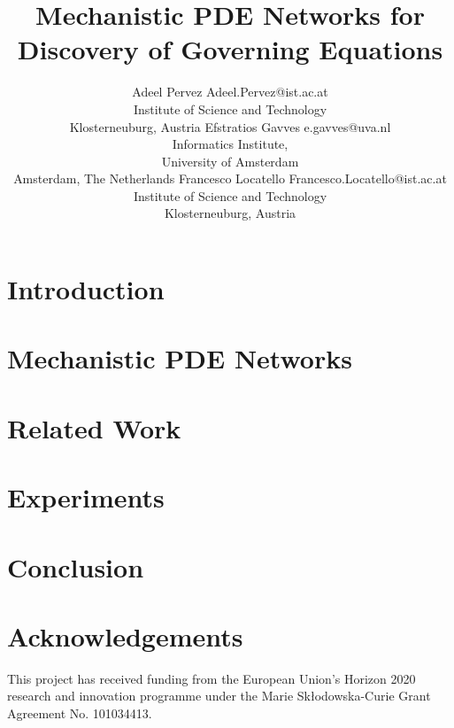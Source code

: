 \documentclass[twoside,11pt]{article}
\begin{document}
\title{Mechanistic PDE Networks for Discovery of Governing Equations}

\author{\name Adeel Pervez \email Adeel.Pervez@ist.ac.at \\
       \addr Institute of Science and Technology\\
       Klosterneuburg, Austria 
       \AND
       \name Efstratios Gavves \email e.gavves@uva.nl \\
       \addr Informatics Institute,\\
       University of Amsterdam\\
       Amsterdam, The Netherlands 
       \AND
       \name Francesco Locatello \email Francesco.Locatello@ist.ac.at\\
       \addr Institute of Science and Technology\\
       Klosterneuburg, Austria 
       }













\maketitle
\begin{abstract}

\end{abstract}


\section{Introduction}
\label{sec:intro}

\section{Mechanistic PDE Networks}
\label{sec:method}

\section{Related Work}
\label{sec:related}

\section{Experiments}
\label{sec:experiments}

\section{Conclusion}
\label{sec:conclusion}


\newpage
\section*{Acknowledgements}
This project has received funding from the European Union’s Horizon 2020 research and innovation programme under the Marie Skłodowska-Curie Grant Agreement No. 101034413.




\newpage
\appendix


\end{document}
